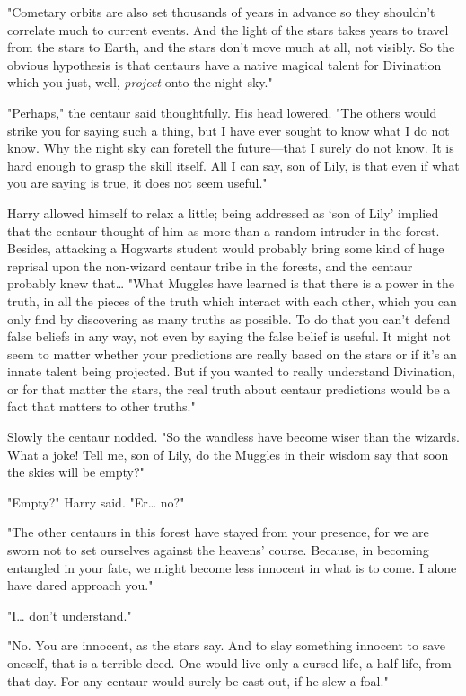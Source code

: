 "Cometary orbits are also set thousands of years in advance so they shouldn't
correlate much to current events. And the light of the stars takes years to
travel from the stars to Earth, and the stars don't move much at all, not
visibly. So the obvious hypothesis is that centaurs have a native magical
talent for Divination which you just, well, \emph{project} onto the night sky."

"Perhaps," the centaur said thoughtfully. His head lowered. "The others would
strike you for saying such a thing, but I have ever sought to know what I do
not know. Why the night sky can foretell the future---that I surely do not
know. It is hard enough to grasp the skill itself. All I can say, son of Lily,
is that even if what you are saying is true, it does not seem useful."

Harry allowed himself to relax a little; being addressed as `son of Lily'
implied that the centaur thought of him as more than a random intruder in the
forest. Besides, attacking a Hogwarts student would probably bring some kind of
huge reprisal upon the non-wizard centaur tribe in the forests, and the centaur
probably knew that{\ldots} "What Muggles have learned is that there is a power
in the truth, in all the pieces of the truth which interact with each other,
which you can only find by discovering as many truths as possible. To do that
you can't defend false beliefs in any way, not even by saying the false belief
is useful. It might not seem to matter whether your predictions are really
based on the stars or if it's an innate talent being projected. But if you
wanted to really understand Divination, or for that matter the stars, the real
truth about centaur predictions would be a fact that matters to other truths."

Slowly the centaur nodded. "So the wandless have become wiser than the wizards.
What a joke! Tell me, son of Lily, do the Muggles in their wisdom say that soon
the skies will be empty?"

"Empty?" Harry said. "Er{\ldots} no?"

"The other centaurs in this forest have stayed from your presence, for we are
sworn not to set ourselves against the heavens' course. Because, in becoming
entangled in your fate, we might become less innocent in what is to come. I
alone have dared approach you."

"I{\ldots} don't understand."

"No. You are innocent, as the stars say. And to slay something innocent to save
oneself, that is a terrible deed. One would live only a cursed life, a
half-life, from that day. For any centaur would surely be cast out, if he slew
a foal."

